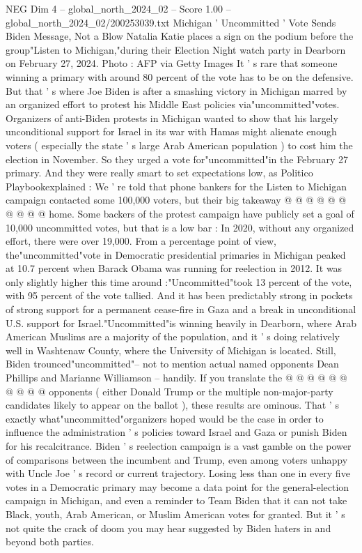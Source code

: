 \begin{textsample}{NEG Dim 4 – global\_north\_2024\_02 – Score 1.00 – global\_north\_2024\_02/200253039.txt}  \label{ex:f4_neg_275}
Michigan ' Uncommitted ' Vote Sends Biden Message, Not a Blow Natalia Katie places a sign on the podium before the group"Listen to Michigan,"during their Election Night watch party in Dearborn on February 27, 2024.
Photo : AFP via Getty Images It ' s rare that someone winning a primary with around 80 percent of the vote has to be on the defensive.
But that ' s where Joe Biden is after a smashing victory in Michigan marred by an organized effort to protest his Middle East policies via"uncommitted"votes.
Organizers of anti-Biden protests in Michigan wanted to show that his largely unconditional support for Israel in its war with Hamas might alienate enough voters ( especially the state ' s large Arab American population ) to cost him the election in November.
So they urged a vote for"uncommitted"in the February 27 primary.
And they were really smart to set expectations low, as Politico Playbookexplained : We ' re told that phone bankers for the Listen to Michigan campaign contacted some 100,000 voters, but their big takeaway @ @ @ @ @ @ @ @ @ @ home.
Some backers of the protest campaign have publicly set a goal of 10,000 uncommitted votes, but that is a low bar : In 2020, without any organized effort, there were over 19,000.
From a percentage point of view, the"uncommitted"vote in Democratic presidential primaries in Michigan peaked at 10.7 percent when Barack Obama was running for reelection in 2012.
It was only slightly higher this time around :"Uncommitted"took 13 percent of the vote, with 95 percent of the vote tallied.
And it has been predictably strong in pockets of strong support for a permanent cease-fire in Gaza and a break in unconditional U.S. support for Israel."Uncommitted"is winning heavily in Dearborn, where Arab American Muslims are a majority of the population, and it ' s doing relatively well in Washtenaw County, where the University of Michigan is located.
Still, Biden trounced"uncommitted"-- not to mention actual named opponents Dean Phillips and Marianne Williamson -- handily.
If you translate the @ @ @ @ @ @ @ @ @ @ opponents ( either Donald Trump or the multiple non-major-party candidates likely to appear on the ballot ), these results are ominous.
That ' s exactly what"uncommitted"organizers hoped would be the case in order to influence the administration ' s policies toward Israel and Gaza or punish Biden for his recalcitrance.
Biden ' s reelection campaign is a vast gamble on the power of comparisons between the incumbent and Trump, even among voters unhappy with Uncle Joe ' s record or current trajectory.
Losing less than one in every five votes in a Democratic primary may become a data point for the general-election campaign in Michigan, and even a reminder to Team Biden that it can not take Black, youth, Arab American, or Muslim American votes for granted.
But it ' s not quite the crack of doom you may hear suggested by Biden haters in and beyond both parties.

\end{textsample}
